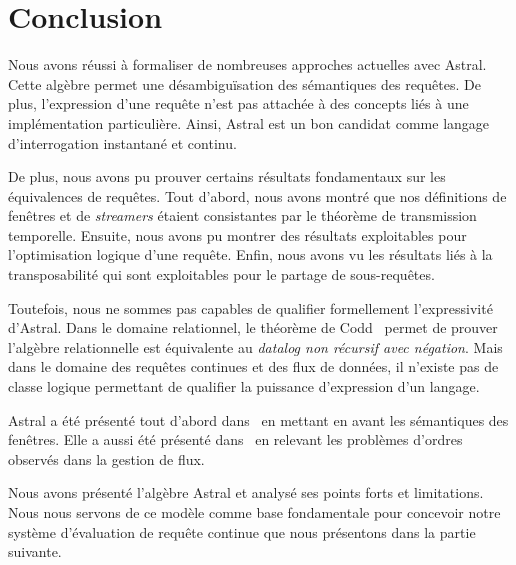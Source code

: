\section{Conclusion}\label{sec:valid:expressivite:conclusion}
Nous avons réussi à formaliser de nombreuses approches actuelles avec Astral. Cette algèbre permet une désambiguïsation des sémantiques des requêtes. De plus, l'expression d'une requête n'est pas attachée à des concepts liés à une implémentation particulière. Ainsi, Astral est un bon candidat comme langage d'interrogation instantané et continu.

De plus, nous avons pu prouver certains résultats fondamentaux sur les équivalences de requêtes. Tout d'abord, nous avons montré que nos définitions de fenêtres et de \textit{streamers} étaient consistantes par le théorème de transmission temporelle. Ensuite, nous avons pu montrer des résultats exploitables pour l'optimisation logique d'une requête. Enfin, nous avons vu les résultats liés à la transposabilité qui sont exploitables pour le partage de sous-requêtes.

Toutefois, nous ne sommes pas capables de qualifier formellement l'expressivité d'Astral. Dans le domaine relationnel, le théorème de Codd~\cite{Codd:theorem} permet de prouver l'algèbre relationnelle est équivalente au \textit{datalog non récursif avec négation}. Mais dans le domaine des requêtes continues et des flux de données, il n'existe pas de classe logique permettant de qualifier la puissance d'expression d'un langage.

Astral a été présenté tout d'abord dans~\cite{Petit:window} en mettant en avant les sémantiques des fenêtres. Elle a aussi été présenté dans~\cite{Petit:revisiting} en relevant les problèmes d'ordres observés dans la gestion de flux.

Nous avons présenté l'algèbre Astral et analysé ses points forts et limitations. Nous nous servons de ce modèle comme base fondamentale pour concevoir notre système d'évaluation de requête continue que nous présentons dans la partie suivante.